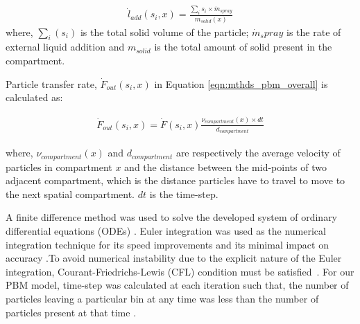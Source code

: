 \documentclass[preprint,10pt,authoryear,review]{elsarticle}
\begin{document}
\begin{align}
\dot{l}_{add}(s_i,x) = \frac{\sum_is_i\times\dot{m}_{spray}}{m_{solid}(x)}
\label{eqn:mthds_liq_addn_rate}
\end{align}
where, $\sum_i(s_i)$  is the total solid volume of the particle; $\dot{m}_spray$ is the 
rate of external liquid addition and $m_{solid}$ is the total amount of solid present in the compartment.
%
%
%

Particle transfer rate, $\dot{F}_{out}(s_i,x)$ in Equation \ref{eqn:mthds_pbm_overall} 
is calculated as:

\begin{align}
\dot{F}_{out}(s_i,x) = \dot{F}(s_i,x)\frac{\nu_{compartment}(x)\times dt}{d_{compartment}}
\label{eqn:mthds_f_out_dot_part_trans_rate}
\end{align}

where, $\nu_{compartment}(x)$ and $d_{compartment}$ are respectively the average 
velocity of particles in compartment $x$ and the distance between the mid-points 
of two adjacent compartment, which is the distance particles have to travel to 
move to the next spatial compartment. $dt$ is the time-step.

A finite difference method was used to solve the developed system of ordinary differential 
equations (ODEs) \citep{Barrasso2015cerd}. 
Euler integration was used as the numerical integration technique for its speed 
improvements and its minimal impact on accuracy \citep{Barrasso2013}.To avoid numerical 
instability due to the explicit nature of the Euler integration, Courant-Friedrichs-Lewis 
(CFL) condition must be satisfied~\citep{courant1967}. For our PBM model, time-step was 
calculated at each iteration such that, the number of particles leaving a particular bin 
at any time was less than the number of particles present at that time \citep{Ramachandran2010}.
\end{document}
